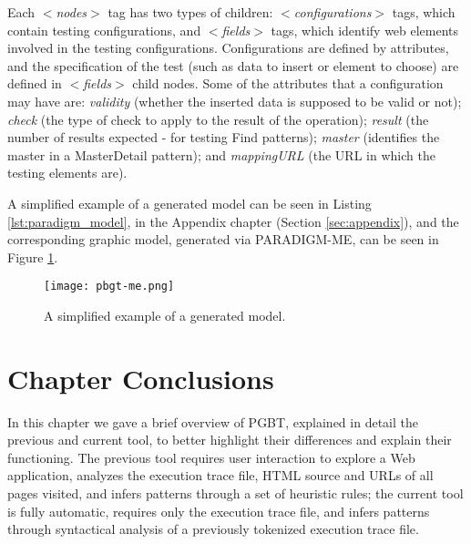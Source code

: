 Each $<$\textit{nodes}$>$ tag has two types of children: $<$\textit{configurations}$>$ tags, which contain testing configurations, and $<$\textit{fields}$>$ tags, which identify web elements involved in the testing configurations. Configurations are defined by attributes, and the specification of the test (such as data to insert or element to choose) are defined in $<$\textit{fields}$>$ child nodes. Some of the attributes that a configuration may have are: \textit{validity} (whether the inserted data is supposed to be valid or not); \textit{check} (the type of check to apply to the result of the operation); \textit{result} (the number of results expected - for testing Find patterns); \textit{master} (identifies the master in a MasterDetail pattern); and \textit{mappingURL} (the URL in which the testing elements are).

A simplified example of a generated model can be seen in Listing \ref{lst:paradigm_model}, in the Appendix chapter (Section \ref{sec:appendix}), and the corresponding graphic model, generated via PARADIGM-ME, can be seen in Figure \ref{fig:pbgt-me}.

\begin{figure}[!htb]
\centering
\texttt{[image: pbgt-me.png]}
\caption{A simplified example of a generated model.}
\label{fig:pbgt-me}
\end{figure}

\section{Chapter Conclusions}
In this chapter we gave a brief overview of PGBT, explained in detail the previous and current tool, to better highlight their differences and explain their functioning. The previous tool requires user interaction to explore a Web application, analyzes the execution trace file, HTML source and URLs  of all pages visited, and infers patterns through a set of heuristic rules; the current tool is fully automatic, requires only the execution trace file, and infers patterns through syntactical analysis of a previously tokenized execution trace file.

